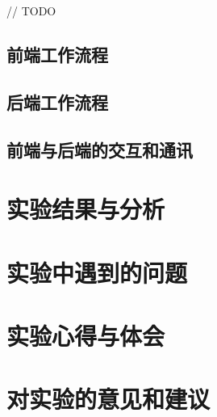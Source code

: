 \documentclass[paper=a4, fontsize=11pt, UTF8]{article} %
\numberwithin{equation}{section} %
\numberwithin{figure}{section} %
\numberwithin{table}{section} %
\begin{document}
// TODO

\subsection{前端工作流程}



\subsection{后端工作流程}



\subsection{前端与后端的交互和通讯}



\section{实验结果与分析}



\section{实验中遇到的问题}



\section{实验心得与体会}



\section{对实验的意见和建议}
\end{document}
